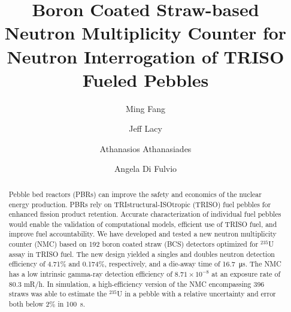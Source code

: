 \documentclass[preprint,final]{elsarticle}
\begin{document}
% 

\begin{frontmatter}

\title{Boron Coated Straw-based Neutron Multiplicity Counter for Neutron Interrogation of TRISO Fueled Pebbles}


\author[uiuc]{Ming Fang}
\author[PTI]{Jeff Lacy}
\author[PTI]{Athanasios Athanasiades}
                   
\author[uiuc]{Angela Di Fulvio}

\begin{abstract}
    Pebble bed reactors (PBRs) can improve the safety and economics of the nuclear energy production. PBRs rely on TRIstructural-ISOtropic (TRISO) fuel pebbles for enhanced fission product retention. Accurate characterization of individual fuel pebbles would enable the validation of computational models, efficient use of TRISO fuel, and improve fuel accountability. We have developed and tested a new neutron multiplicity counter (NMC) based on 192 boron coated straw (BCS) detectors optimized for ${}^{235}$U assay in TRISO fuel. The new design yielded a singles and doubles neutron detection efficiency  of 4.71\% and 0.174\%, respectively, and a die-away time of \SI{16.7}{\micro\second}. The NMC has a low intrinsic gamma-ray detection efficiency of $8.71\times10^{-8}$ at an exposure rate of 80.3 mR/h. In simulation, a high-efficiency version of the NMC encompassing 396 straws was able to estimate the ${}^{235}$U in a pebble with a relative uncertainty and error both below 2\% in \SI{100}{\s}. 


\end{abstract}
\end{frontmatter}
\end{document}
